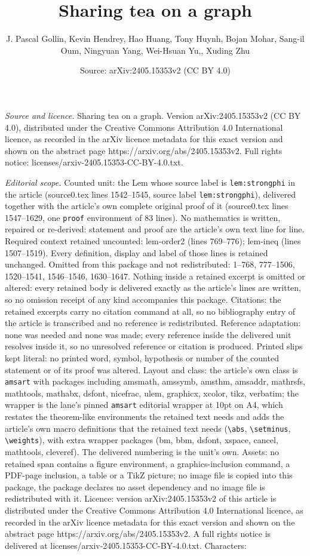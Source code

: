\documentclass[10pt,a4paper]{amsart}
\title[Sharing tea on a graph]{Sharing tea on a graph}
\author{J. Pascal Gollin, Kevin Hendrey, Hao Huang, Tony Huynh, Bojan Mohar, Sang-il Oum, Ningyuan Yang, Wei-Hsuan Yu,, Xuding Zhu}
\date{Source: arXiv:2405.15353v2 (CC BY 4.0)}
\begin{document}
\maketitle

\noindent\emph{Source and licence.} Sharing tea on a graph. Version arXiv:2405.15353v2 (CC BY 4.0), distributed under the Creative Commons Attribution 4.0 International licence, as recorded in the arXiv licence metadata for this exact version and shown on the abstract page https://arxiv.org/abs/2405.15353v2. Full rights notice: licenses/arxiv-2405.15353-CC-BY-4.0.txt.\par\smallskip

\noindent\textit{Editorial scope.} Counted unit: the Lem whose source label is \texttt{lem:strongphi} in the article (source0.tex lines 1542--1545, source label \texttt{lem:strongphi}), delivered together with the article's own complete original proof of it (source0.tex lines 1547--1629, one \texttt{proof} environment of 83 lines). No mathematics is written, repaired or re-derived: statement and proof are the article's own text line for line. Required context retained uncounted: lem-order2 (lines 769--776); lem-ineq (lines 1507--1519). Every definition, display and label of those lines is retained unchanged. Omitted from this package and not redistributed: 1--768, 777--1506, 1520--1541, 1546--1546, 1630--1647. Nothing inside a retained excerpt is omitted or altered: every retained body is delivered exactly as the article's lines are written, so no omission receipt of any kind accompanies this package. Citations: the retained excerpts carry no citation command at all, so no bibliography entry of the article is transcribed and no reference is redistributed. Reference adaptation: none was needed and none was made; every reference inside the delivered unit resolves inside it, so no unresolved reference or citation is produced. Printed slips kept literal: no printed word, symbol, hypothesis or number of the counted statement or of its proof was altered. Layout and class: the article's own class is \texttt{amsart} with packages including amsmath, amssymb, amsthm, amsaddr, mathrsfs, mathtools, mathabx, dsfont, nicefrac, ulem, graphicx, xcolor, tikz, verbatim; the wrapper is the lane's pinned \texttt{amsart} editorial wrapper at 10pt on A4, which restates the theorem-like environments the retained text needs and adds the article's own macro definitions that the retained text needs (\texttt{\textbackslash abs}, \texttt{\textbackslash setminus}, \texttt{\textbackslash weights}), with extra wrapper packages (bm, bbm, dsfont, xspace, cancel, mathtools, cleveref). The delivered numbering is the unit's own. Assets: no retained span contains a figure environment, a graphics-inclusion command, a PDF-page inclusion, a table or a TikZ picture; no image file is copied into this package, the package declares no asset dependency and no image file is redistributed with it. Licence: version arXiv:2405.15353v2 of this article is distributed under the Creative Commons Attribution 4.0 International licence, as recorded in the arXiv licence metadata for this exact version and shown on the abstract page https://arxiv.org/abs/2405.15353v2. A full rights notice is delivered at licenses/arxiv-2405.15353-CC-BY-4.0.txt. Characters: 
\end{document}
